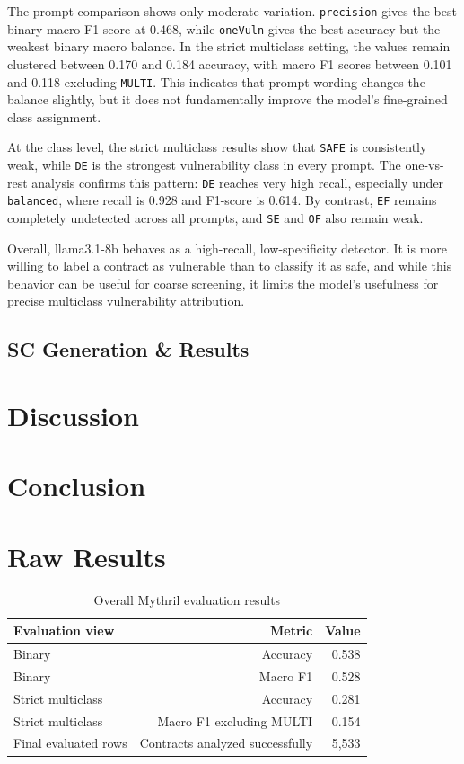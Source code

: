 \documentclass[a4paper,11pt]{article}\usepackage{graphicx} %
\begin{document}
The prompt comparison shows only moderate variation. \texttt{precision} gives the best binary macro F1-score at 0.468, while \texttt{oneVuln} gives the best accuracy but the weakest binary macro balance. In the strict multiclass setting, the values remain clustered between 0.170 and 0.184 accuracy, with macro F1 scores between 0.101 and 0.118 excluding \texttt{MULTI}. This indicates that prompt wording changes the balance slightly, but it does not fundamentally improve the model’s fine-grained class assignment.

At the class level, the strict multiclass results show that \texttt{SAFE} is consistently weak, while \texttt{DE} is the strongest vulnerability class in every prompt. The one-vs-rest analysis confirms this pattern: \texttt{DE} reaches very high recall, especially under \texttt{balanced}, where recall is 0.928 and F1-score is 0.614. By contrast, \texttt{EF} remains completely undetected across all prompts, and \texttt{SE} and \texttt{OF} also remain weak.

Overall, llama3.1-8b behaves as a high-recall, low-specificity detector. It is more willing to label a contract as vulnerable than to classify it as safe, and while this behavior can be useful for coarse screening, it limits the model’s usefulness for precise multiclass vulnerability attribution.

\subsection{SC Generation \& Results}

\section{Discussion}
\section{Conclusion}
\newpage
\section*{Raw Results}
\begin{table}[htbp]
\centering
\caption{Overall Mythril evaluation results}
\label{tab:mythril_overall}
\begin{tabular}{lrr}
\hline
Evaluation view & Metric & Value \\
\hline
Binary & Accuracy & 0.538 \\
Binary & Macro F1 & 0.528 \\
Strict multiclass & Accuracy & 0.281 \\
Strict multiclass & Macro F1 excluding MULTI & 0.154 \\
Final evaluated rows & Contracts analyzed successfully & 5{,}533 \\
\hline
\end{tabular}
\end{table}
\end{document}
